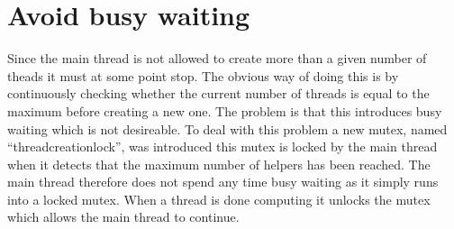 \documentclass[a4paper,10pt]{article}
\begin{document}
\section{Avoid busy waiting}
Since the main thread is not allowed to create more than a given number of theads it must at some point stop. The obvious way of doing this is by continuously checking whether the current number of threads is equal to the maximum before creating a new one. The problem is that this introduces busy waiting which is not desireable. To deal with this problem a new mutex, named ``threadcreationlock'', was introduced this mutex is locked by the main thread when it detects that the maximum number of helpers has been reached. The main thread therefore does not spend any time busy waiting as it simply runs into a locked mutex. When a thread is done computing it unlocks the mutex which allows the main thread to continue.
\end{document}
